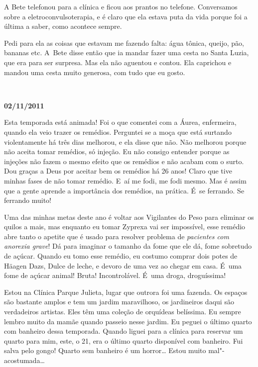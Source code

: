 A Bete telefonou para a clínica e ficou aos prantos no telefone.
Conversamos sobre a eletroconvulsoterapia, e é claro que ela estava puta
da vida porque foi a última a saber, como acontece sempre.

Pedi para ela as coisas que estavam me fazendo falta: água tônica,
queijo, pão, bananas etc. A~Bete disse então que ia mandar fazer uma
cesta no Santa Luzia, que era para ser surpresa. Mas ela não aguentou e
contou. Ela caprichou e mandou uma cesta muito generosa, com tudo que eu
gosto.

\begin{center}\asterisc{}​\end{center}


\begin{flushright}\textbf{02/11/2011}\end{flushright}


Esta temporada está animada! Foi o que comentei com a Áurea, enfermeira,
quando ela veio trazer os remédios. Perguntei se a moça que está
surtando violentamente há três dias melhorou, e ela disse que não. Não
melhorou porque não aceita tomar remédios, só injeção. Eu não consigo
entender porque as injeções não fazem o mesmo efeito que os remédios e
não acabam com o surto. Dou graças a Deus por aceitar bem os remédios há
26 anos! Claro que tive minhas fases de não tomar remédio. E~aí me fodi,
me fodi mesmo. Mas é assim que a gente aprende a importância dos
remédios, na prática. É~se ferrando. Se ferrando muito!

Uma das minhas metas deste ano é voltar aos Vigilantes do Peso para
eliminar os quilos a mais, mas enquanto eu tomar Zyprexa vai ser
impossível, esse remédio abre tanto o apetite que é usado para resolver
problema de \emph{pacientes com anorexia grave}!\textbf{} Dá para
imaginar o tamanho da fome que ele dá, fome sobretudo de açúcar. Quando
eu tomo esse remédio, eu costumo comprar dois potes de Häagen Dazs,
Dulce de leche, e devoro de uma vez ao chegar em casa. É~uma fome de
açúcar animal! Bruta! Incontrolável. É~uma droga, droguíssima!

Estou na Clínica Parque Julieta, lugar que outrora foi uma fazenda. Os
espaços são bastante amplos e tem um jardim maravilhoso, os jardineiros
daqui são verdadeiros artistas. Eles têm uma coleção de orquídeas
belíssima. Eu sempre lembro muito da mamãe quando passeio nesse jardim.
Eu peguei o último quarto com banheiro dessa temporada. Quando liguei
para a clínica para reservar um quarto para mim, este, o 21, era o
último quarto disponível com banheiro. Fui salva pelo gongo! Quarto sem
banheiro é um horror… Estou muito mal"-acostumada…

